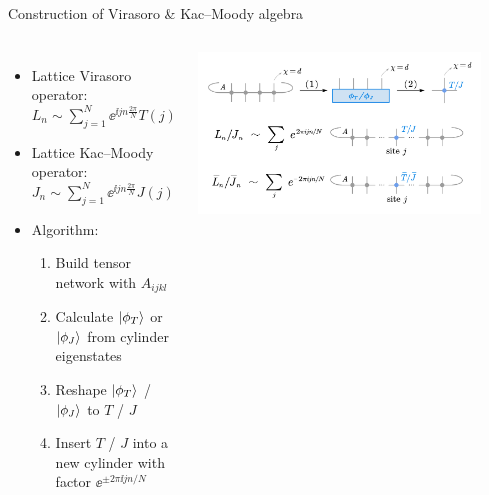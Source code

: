 \documentclass{fdubeamer}
\begin{document}
\begin{frame}{Construction of Virasoro \& Kac--Moody algebra}

\begin{columns}[c]


    \begin{itemize}
      \item Lattice Virasoro operator: \\
        \mbox{\quad} $L_n \sim \sum_{j=1}^N \ee^{ \ii j n \frac{2\pi}{N}} T(j)$
      \item Lattice Kac--Moody operator: \\
        \mbox{\quad} $J_n \sim \sum_{j=1}^N \ee^{ \ii j n \frac{2\pi}{N}} J(j)$
      \item Algorithm:

        \begin{enumerate}
          \item Build tensor network with $A_{ijkl}$
          \item Calculate $\ket{\phi_T}$ or $\ket{\phi_J}$ from cylinder eigenstates
          \item Reshape $\ket{\phi_T}$ / $\ket{\phi_J}$ to $T$ / $J$
          \item Insert $T$ / $J$ into a new cylinder with factor $\ee^{\pm2\pi\ii j n/N}$
        \end{enumerate}
    \end{itemize}


    \centering
    \includegraphics[width=0.9\textwidth]{images/virasoro/construction.pdf}

\end{columns}


\end{frame}
\end{document}
